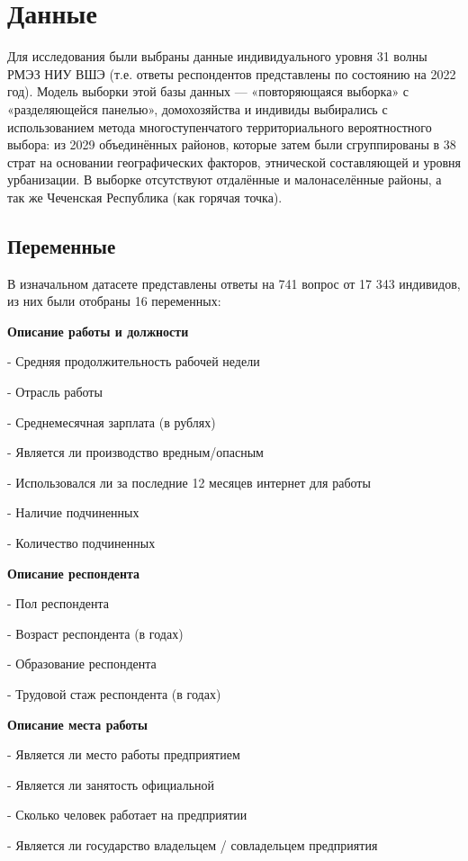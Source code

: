 \documentclass[12pt, a4paper]{article}
\begin{document}
{		\section{Данные}
		Для исследования были выбраны данные индивидуального уровня 31 волны РМЭЗ НИУ ВШЭ (т.е. ответы респондентов представлены по состоянию на 2022 год). Модель выборки этой базы данных — «повторяющаяся выборка» с «разделяющейся панелью», домохозяйства и индивиды выбирались с использованием метода многоступенчатого территориального вероятностного выбора: из 2029 объединённых районов, которые затем были сгруппированы в 38 страт на основании географических факторов, этнической составляющей и уровня урбанизации. В выборке отсутствуют отдалённые и малонаселённые районы, а так же Чеченская Республика (как горячая точка).
		
		\subsection{Переменные}
		В изначальном датасете представлены ответы на 741 вопрос от 17 343 индивидов, из них были отобраны 16 переменных:
		
		\textbf{Описание работы и должности}
		
		-   Средняя продолжительность рабочей недели
		
		-   Отрасль работы 
		
		-   Среднемесячная зарплата (в рублях)
		
		-   Является ли производство вредным/опасным
		
		-   Использовался ли за последние 12 месяцев интернет для работы
		
		-   Наличие подчиненных
		
		-   Количество подчиненных
		
		\textbf{Описание респондента}
		
		-   Пол респондента
		
		-   Возраст респондента (в годах)
		
		-   Образование респондента
		
		-   Трудовой стаж респондента (в годах)
		
		\textbf{Описание места работы}
		
		-   Является ли место работы предприятием
		
		-   Является ли занятость официальной
		
		-   Сколько человек работает на предприятии
		
		-   Является ли государство владельцем / совладельцем предприятия
		
}
\end{document}
